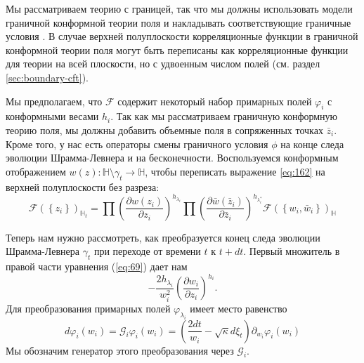 Мы рассматриваем теорию с границей, так что мы должны использовать модели граничной конформной теории поля и накладывать соответствующие граничные условия \cite{cardy1984conformal,cardy1989boundary,cardy1991bulk}. В случае верхней полуплоскости корреляционные функции в граничной конформной теории поля могут быть переписаны как корреляционные функции для теории на всей плоскости, но с удвоенным числом полей (см. раздел \ref{sec:boundary-cft}).


Мы предполагаем, что $\mathcal{F}$ содержит некоторый набор примарных полей  $\varphi_{i}$ с конформными весами $h_{i}$. Так как мы рассматриваем граничную конформную теорию поля, мы должны добавить объемные поля в сопряженных точках  $\bar z_{i}$.  Кроме того, у нас есть операторы смены граничного условия   $\phi$ на конце следа эволюции Шрамма-Левнера и на бесконечности. Воспользуемся конформным отображением   $w(z):\mathbb{H}\setminus\gamma_{t}\to \mathbb{H}$, чтобы переписать выражение \eqref{eq:162} на верхней полуплоскости без разреза:
\begin{equation}
  \mathcal{F}(\left\{z_{i}\right\})_{\mathbb{H}_{t}}=\prod \left(\frac{\partial w(z_{i})}{\partial z_{i}}\right)^{h_{\lambda_i}} 
  \prod \left(\frac{\partial \bar w(\bar z_{i})}{\partial \bar z_{i}}\right)^{h_{\lambda^{*}_i}}
  \mathcal{F}(\left\{w_{i}, \bar w_{i}\right\})_{\mathbb{H}}
  \label{eq:69}
\end{equation}

Теперь нам нужно рассмотреть, как преобразуется конец следа эволюции Шрамма-Левнера  $\gamma_{t}$ при переходе от времени $t$ к $t+ dt$. Первый множитель в правой части уравнения  (\ref{eq:69}) дает нам
\begin{equation*}
  -\frac{2h_{\lambda_{i}}}{w_{i}^{2}}\left(\frac{\partial w_{i}}{\partial z_{i}}\right)^{h_{i}}.
\end{equation*}
Для преобразования примарных полей  $\varphi_{\lambda_{i}}$ имеет место равенство
\begin{equation}
\label{eq:70}
  d\varphi_{i}(w_{i}) = \mathcal{G}_{i}\varphi_{i}(w_{i})=\left(\frac{2dt}{w_{i}}-\sqrt{\kappa} d\xi_{t}\right) \partial_{w_{i}}\varphi_{i}(w_{i}) 
\end{equation}
Мы обозначим генератор этого преобразования через  $\mathcal{G}_{i}$.

